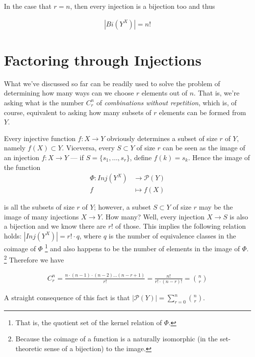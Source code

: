 \documentclass{amsart}
\begin{document}
In the case that $r = n$, then every injection is a bijection too and thus

\begin{align}
|Bi(Y^{X})| = n!
\end{align}




\section*{Factoring through Injections}
What we've discussed so far can be readily used to solve the problem of determining how many
ways can we choose $r$ elements out of $n$.  That is, we're asking what is the number $C_{r}^{n}$ 
of \emph{combinations without repetition}, which is, of course, equivalent to asking how many
subsets of $r$ elements can be formed from $Y$.

Every injective function $f:X \rightarrow Y$ obviously determines a subset of size $r$ of $Y$,
namely $f(X) \subset Y$.  Viceversa, every $S \subset Y$ of size $r$ can be seen as the image
of an injection $f:X \rightarrow Y$ --- if $S = \{s_{1},\ldots,s_{r}\}$, define $f(k) = s_{k}$. 
Hence the image of the function
\begin{align*}
\Phi : Inj(Y^{X}) & \longrightarrow \mathcal{P}(Y) \\
                f & \longmapsto      f(X) 
\end{align*}

\noindent is all the subsets of size $r$ of $Y$; however, a subset $S \subset Y$ of size $r$
may be the image of many injections $X \rightarrow Y$.  How many?  Well, every injection
$X \rightarrow S$ is also a bijection and we know there are $r!$ of those.  This implies the
following relation holds: $|Inj(Y^{X})| =  r! \cdot q$, where $q$ is the number of equivalence
classes in the coimage of $\Phi$
\footnote{That is, the quotient set of the kernel relation of $\Phi$.}
and also happens to be the number of elements in the image of $\Phi$.%
\footnote{Because the coimage of a function is a naturally isomorphic (in the set-theoretic sense
of a bijection) to the image.}
Therefore we have

\begin{align}
C_{r}^{n} = \frac{n \cdot (n-1) \cdot (n-2) \ldots (n-r+1)}{r!} = \frac{n!}{r! \cdot (n-r)!} = 
{n \choose r}
\end{align}

\noindent
A straight consequence of this fact is that $|\mathcal{P}(Y)| = \displaystyle\sum_{r=0}^{n} {n \choose r}$.
\end{document}
